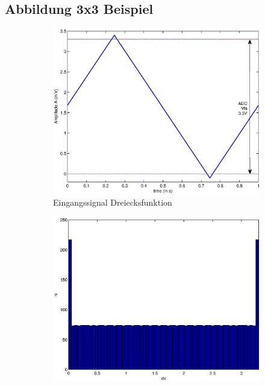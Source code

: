 \documentclass[TGAI_Laborbericht.tex]{subfiles}
\begin{document}
\subsection{Abbildung 3x3 Beispiel}
\begin{figure}[!ht]
	\begin{subfigure}{.499\textwidth}
		\centering\small
		\includegraphics[width=\textwidth]{media/matlab/HISTOGRAM/ramp_fkt_samples_5000.eps}
		\caption{Eingangssignal Dreiecksfunktion}
	\end{subfigure}\label{fig:GRUNDL_RAMP_RAMP_3X3}
	\begin{subfigure}{.499\textwidth}
		\centering\small
		\includegraphics[width=\textwidth]{media/matlab/HISTOGRAM/ramp_hist_samples_5000.eps}

\end{subfigure}
\end{figure}
\end{document}
